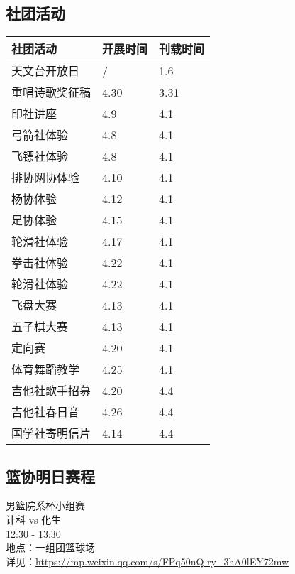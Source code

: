 \documentclass[letterpaper, 12pt]{article}
\begin{document}
\begin{multicols}{2}
\section{社团活动}
\begin{tabular}{|>{\centering\arraybackslash}m{}|m{}|m{}|}
    \hline
    社团活动 & 开展时间 & 刊载时间\\
    \hline\hline
    天文台开放日 & / & 1.6\\
    重唱诗歌奖征稿 & 4.30 & 3.31\\
    印社讲座 & 4.9 & 4.1\\
    弓箭社体验 & 4.8 & 4.1\\
    飞镖社体验 & 4.8 & 4.1\\
    排协网协体验 & 4.10 & 4.1\\
    杨协体验 & 4.12 & 4.1\\
    足协体验 & 4.15 & 4.1\\
    轮滑社体验 & 4.17 & 4.1\\
    拳击社体验 & 4.22 & 4.1\\
    轮滑社体验 & 4.22 & 4.1\\
    飞盘大赛 & 4.13 & 4.1\\
    五子棋大赛 & 4.13 & 4.1\\
    定向赛 & 4.20 & 4.1\\
    体育舞蹈教学 & 4.25 & 4.1\\
    吉他社歌手招募 & 4.20 & 4.4\\
    吉他社春日音 & 4.26 & 4.4\\
    国学社寄明信片 & 4.14 & 4.4\\

    \hline
\end{tabular}
\subsection{篮协明日赛程}
男篮院系杯小组赛
\\计科 vs 化生
\\12:30 - 13:30
\\地点：一组团篮球场
\\详见：\url{https://mp.weixin.qq.com/s/FPq50nQ-ry_3hA0lEY72mw}
\end{multicols}
\end{document}
